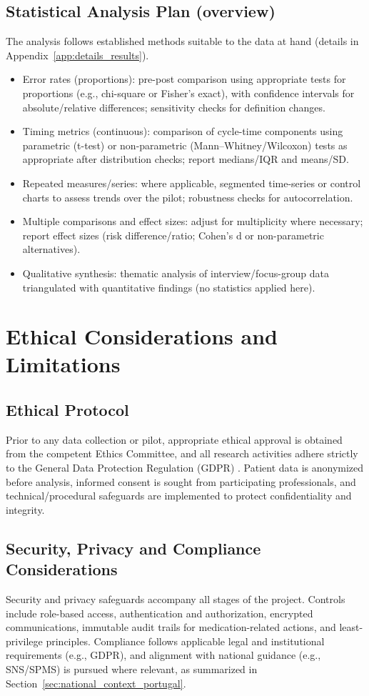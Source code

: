 \subsection{Statistical Analysis Plan (overview)}
The analysis follows established methods suitable to the data at hand (details in Appendix~\ref{app:details_results}).
\begin{itemize}
    \item Error rates (proportions): pre-post comparison using appropriate tests for proportions (e.g., chi-square or Fisher's exact), with confidence intervals for absolute/relative differences; sensitivity checks for definition changes.
    \item Timing metrics (continuous): comparison of cycle-time components using parametric (t-test) or non-parametric (Mann–Whitney/Wilcoxon) tests as appropriate after distribution checks; report medians/IQR and means/SD.
    \item Repeated measures/series: where applicable, segmented time-series or control charts to assess trends over the pilot; robustness checks for autocorrelation.
    \item Multiple comparisons and effect sizes: adjust for multiplicity where necessary; report effect sizes (risk difference/ratio; Cohen's d or non-parametric alternatives).
    \item Qualitative synthesis: thematic analysis of interview/focus-group data triangulated with quantitative findings (no statistics applied here).
\end{itemize}

\section{Ethical Considerations and Limitations}

\subsection{Ethical Protocol}
Prior to any data collection or pilot, appropriate ethical approval is obtained from the competent Ethics Committee, and all research activities adhere strictly to the General Data Protection Regulation (GDPR) \cite{european2016}. Patient data is anonymized before analysis, informed consent is sought from participating professionals, and technical/procedural safeguards are implemented to protect confidentiality and integrity.

\subsection{Security, Privacy and Compliance Considerations}
Security and privacy safeguards accompany all stages of the project. Controls include role-based access, authentication and authorization, encrypted communications, immutable audit trails for medication-related actions, and least-privilege principles. Compliance follows applicable legal and institutional requirements (e.g., GDPR), and alignment with national guidance (e.g., SNS/SPMS) is pursued where relevant, as summarized in Section~\ref{sec:national_context_portugal}.

